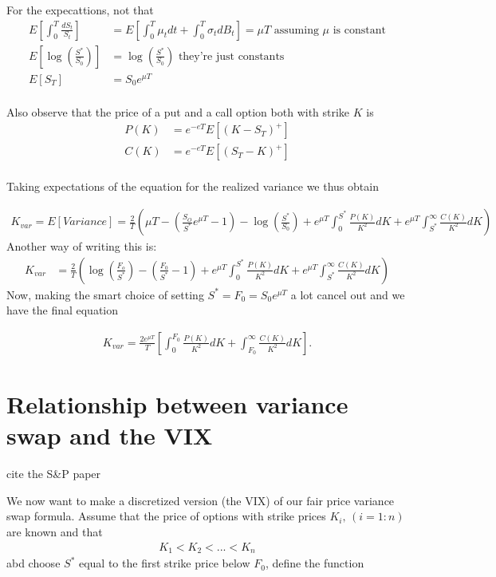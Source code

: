 For the expecattions, not that
\begin{align*}
E\left[\int_{0}^{T}\frac{dS_t}{S_t}\right]&=E\left[\int_{0}^{T}\mu_tdt+\int_{0}^{T}\sigma_tdB_t\right]=\mu T \text{ assuming }\mu\text{ is constant}\\
E\left[\log(\frac{S^*}{S_0})\right]&=\log(\frac{S^*}{S_0})\text{ they're just constants}\\
E\left[S_T\right]&=S_0e^{\mu T}\\
\end{align*}

Also observe that the price of a put and a call option both with strike $K$ is
\begin{align*}
P(K)&=e^{-eT}E\left[\left(K-S_T\right)^+\right]\\
C(K)&=e^{-eT}E\left[\left(S_T-K\right)^+\right]\\
\end{align*}

Taking expectations of the equation for the realized variance we thus obtain 

\begin{align*}
K_{var}=E[Variance]=\frac{2}{T}\left(\mu T-\left(\frac{S_O}{S^*}e^{\mu T}-1\right)
-\log\left(\frac{S^*}{S_0}\right)
+e^{\mu T}
\int_{0}^{S^*}\frac{P(K)}{K^2}dK+e^{\mu T}\int_{S^*}^{\infty}\frac{C(K)}{K^2}dK
\right)
\end{align*}
Another way of writing this is:
\begin{align*}
K_{var}&=\frac{2}{T}\left(\log\left(\frac{F_o}{S^*}\right)-\left(\frac{F_0}{S^*}-1\right)+e^{\mu T}
\int_{0}^{S^*}\frac{P(K)}{K^2}dK+e^{\mu T}\int_{S^*}^{\infty}\frac{C(K)}{K^2}dK
\right)
\end{align*}
Now, making the smart choice of setting $S^*=F_0=S_0e^{\mu T}$ a lot cancel out and we have the final equation

\begin{align*}
K_{var}=\frac{2e^{\mu T}}{T}\left[\int_{0}^{F_0}\frac{P(K)}{K^2}dK+\int_{F_0}^{\infty}\frac{C(K)}{K^2}dK\right].
\end{align*}



\section{Relationship between variance swap and the VIX}
cite the S\&P paper

We now want to make a discretized version (the VIX) of our fair price variance swap formula. Assume that the price of options with strike prices $K_i,\,(i=1:n)$ are known and that
\begin{align*}
K_1<K_2<...<K_n
\end{align*}
abd choose $S^*$ equal to the first strike price below $F_0$, define the function

